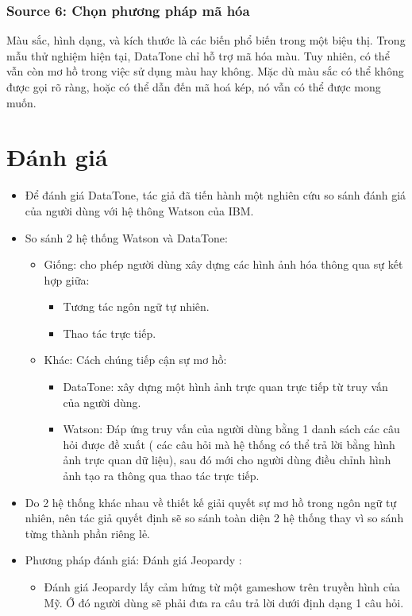 \documentclass[12pt]{report}
\begin{document}
\subsubsection*{Source 6: Chọn phương pháp mã hóa} 
Màu sắc, hình dạng, và kích thước là các biến phổ biến trong một biệu thị. Trong mẫu thử nghiệm hiện tại, DataTone chỉ hỗ trợ mã hóa màu. Tuy nhiên, có thể vẫn còn mơ hồ trong việc sử dụng màu hay không. Mặc dù màu sắc có thể không được gọi rõ ràng, hoặc có thể dẫn đến mã hoá kép, nó vẫn có thể được mong muốn.

\section{Đánh giá}

\begin{itemize}
	\item Để đánh giá DataTone, tác giả đã tiến hành một nghiên cứu so sánh đánh giá của người dùng với hệ thông Watson của IBM.
	\item So sánh 2 hệ thống Watson và DataTone:
		\begin{itemize}
			\item Giống: cho phép người dùng xây dựng các hình ảnh hóa thông qua sự kết hợp giữa:
				\begin{itemize}
					\item Tương tác ngôn ngữ tự nhiên. 
					\item Thao tác trực tiếp.
				\end{itemize}
			\item Khác: Cách chúng tiếp cận sự mơ hồ:
				\begin{itemize}
					\item DataTone:  xây dựng một hình ảnh trực quan trực tiếp từ truy vấn của người dùng.
					\item Watson: Đáp ứng truy vấn của người dùng bằng 1 danh sách các câu hỏi được đề xuất ( các câu hỏi mà hệ thống có thể trả lời bằng hình ảnh trực quan dữ liệu), sau đó mới cho người dùng điều chỉnh hình ảnh tạo ra thông qua thao tác trực tiếp.
				\end{itemize}
		\end{itemize}
	\item Do 2 hệ thống khác nhau về thiết kế giải quyết sự mơ hồ trong ngôn ngữ tự nhiên, nên tác giả quyết định sẽ so sánh toàn diện 2 hệ thống thay vì so sánh từng thành phần riêng lẻ.
	\item Phương pháp đánh giá:  Đánh giá Jeopardy :
		\begin{itemize}
			\item Đánh giá Jeopardy  lấy cảm hứng từ  một gameshow trên truyền hình của Mỹ. Ớ đó người dùng sẽ phải đưa ra câu trả lời dưới định dạng 1 câu hỏi.
			

\end{itemize}
\end{itemize}
\end{document}
